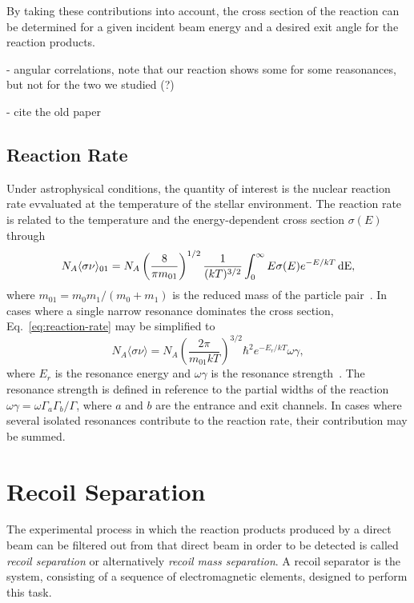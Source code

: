 By taking these contributions into account, the cross section of the reaction
can be determined for a given incident beam energy and a desired exit angle for
the reaction products.

- angular correlations, note that our reaction shows some for some reasonances,
  but not for the two we studied (?)

- cite the old paper

\subsection{Reaction Rate}

Under astrophysical conditions, the quantity of interest is the nuclear
reaction rate evvaluated at the temperature of the stellar environment. The
reaction rate is related to the temperature and the energy-dependent cross
section $\sigma(E)$ through
\begin{equation}
\label{eq:reaction-rate}
    N_A\langle\sigma\nu\rangle_{01} = N_A\left(\frac{8}{\pi m_{01}}\right)^{1/2}
        \frac{1}{(kT)^{3/2}}\int_0^{\infty} E\sigma(E)e^{-E/kT}\,\rm{d}E,
\end{equation}
where $m_{01} = m_0m_1/(m_0 + m_1)$ is the reduced mass of the particle
pair~\cite{Iliadis}. In cases where a single narrow resonance dominates the
cross section, Eq.~\ref{eq:reaction-rate} may be simplified to
\[
    N_A\langle\sigma\nu\rangle = N_A\left(\frac{2\pi}{m_{01}kT}\right)^{3/2}
        \hbar^2e^{-E_r/kT}\omega\gamma,
\]
where $E_r$ is the resonance energy and $\omega\gamma$ is the resonance
strength~\cite{Iliadis}. The resonance strength is defined in reference to the
partial widths of the reaction $\omega\gamma = \omega\Gamma_a\Gamma_b/\Gamma$,
where $a$ and $b$ are the entrance and exit channels. In cases where several
isolated resonances contribute to the reaction rate, their contribution may be
summed.



\section{Recoil Separation}
\label{sec:ch01-recoil-separation}

The experimental process in which the reaction products produced by a direct
beam can be filtered out from that direct beam in order to be detected is
called \emph{recoil separation} or alternatively \emph{recoil mass separation}.
A recoil separator is the system, consisting of a sequence of electromagnetic
elements, designed to perform this task.

